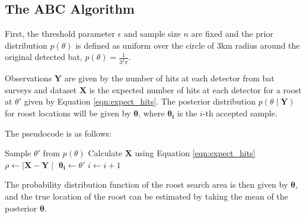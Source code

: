 \subsection{The ABC Algorithm}

First, the threshold parameter $\epsilon$ and sample size $n$ are fixed and the
prior distribution $p(\theta)$ is defined as uniform over the circle of 3km
radius around the original detected bat, $p(\theta) = \frac{1}{3^2 \pi}$.

Observations $\bm{Y}$ are given by the number of hits at each detector from bat
surveys and dataset $\bm{X}$ is the expected number of hits at each detector for
a roost at $\theta'$ given by Equation \ref{eqn:expect_hits}. The posterior
distribution $p(\theta \mid \bm{Y})$ for roost locations will be given by
$\bm{\theta}$, where $\bm{\theta_i}$ is the $i$-th accepted sample.

The pseudocode is as follows:

\begin{algorithmic}
    \State  Sample $\theta'$ from $p(\theta)$
    \State Calculate $\bm{X}$ using Equation \ref{eqn:expect_hits}
    \State $\rho \gets \mid \bm{X} - \bm{Y} \mid$
    \If {$\bar{\rho} < \epsilon$}
      \State $\bm{\theta_i} \gets \theta'$
    	\State $i \gets i + 1$
    \EndIf
  \EndWhile
\end{algorithmic}

The probability distribution function of the roost search area is then given by $\bm{\theta}$, and the true location of the
roost can be estimated by taking the mean of the posterior $\bm{\theta}$.
